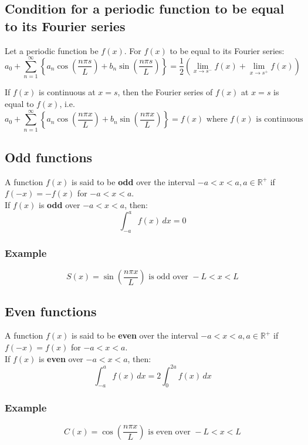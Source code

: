 \documentclass[11pt]{article}
\begin{document}
\subsection{Condition for a periodic function to be equal to its Fourier series}
\label{sec:orgb2a596a}
Let a periodic function be \(f(x)\). For \(f(x)\) to be equal to its Fourier series:
\[a_0 + \sum_{n = 1}^{\infty} \left\{a_n \cos \left( \frac{n \pi s}{L} \right) + b_n \sin \left( \frac{n \pi s}{L} \right) \right\} = \frac{1}{2} \left( \lim_{x \rightarrow s^{-}} f(x) + \lim_{x \rightarrow s^{+}} f(x) \right)\]

If \(f(x)\) is continuous at \(x = s\), then the Fourier series of \(f(x)\) at \(x = s\) is equal to \(f(x)\), i.e.
\[a_0 + \sum_{n = 1}^{\infty} \left\{a_n \cos \left( \frac{n \pi x}{L} \right) + b_n \sin \left( \frac{n \pi x}{L} \right) \right\} = f(x) \text{ where } f(x) \text{ is continuous}\]

\subsection{Odd functions}
\label{sec:org316f86f}
A function \(f(x)\) is said to be \textbf{odd} over the interval \(- a < x < a, a \in \mathbb{R}^{+}\) if \(f(-x) = - f(x)\) for \(-a < x < a\).  \\

If \(f(x)\) is \textbf{odd} over \(-a < x < a\), then:
\[\int_{-a}^{a} f(x) \, dx = 0\]

\subsubsection{Example}
\label{sec:org9ff1c29}
\[S(x) = \sin \left( \frac{n \pi x}{L} \right) \text{ is odd over } -L < x < L\]

\subsection{Even functions}
\label{sec:org735ce21}
A function \(f(x)\) is said to be \textbf{even} over the interval \(- a < x < a, a \in \mathbb{R}^{+}\) if \(f(-x) = f(x)\) for \(-a < x < a\).  \\

If \(f(x)\) is \textbf{even} over \(-a < x < a\), then:
\[\int_{-a}^{a} f(x) \, dx = 2 \int_0^{2a} f(x) \, dx\]

\subsubsection{Example}
\label{sec:org24b9127}
\[C(x) = \cos \left( \frac{n \pi x}{L} \right) \text{ is even over } -L < x < L\]
\end{document}
